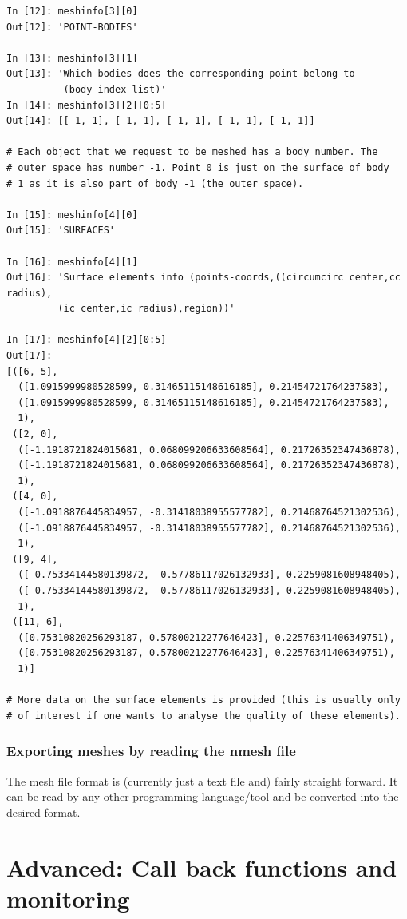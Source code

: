 \documentclass[10pt,a4paper]{book}
\begin{document}
\begin{lstlisting}
In [12]: meshinfo[3][0]
Out[12]: 'POINT-BODIES'

In [13]: meshinfo[3][1]
Out[13]: 'Which bodies does the corresponding point belong to 
          (body index list)'
In [14]: meshinfo[3][2][0:5]
Out[14]: [[-1, 1], [-1, 1], [-1, 1], [-1, 1], [-1, 1]]

# Each object that we request to be meshed has a body number. The 
# outer space has number -1. Point 0 is just on the surface of body 
# 1 as it is also part of body -1 (the outer space).

In [15]: meshinfo[4][0]
Out[15]: 'SURFACES'

In [16]: meshinfo[4][1]
Out[16]: 'Surface elements info (points-coords,((circumcirc center,cc radius),
         (ic center,ic radius),region))'

In [17]: meshinfo[4][2][0:5]
Out[17]: 
[([6, 5],
  ([1.0915999980528599, 0.31465115148616185], 0.21454721764237583),
  ([1.0915999980528599, 0.31465115148616185], 0.21454721764237583),
  1),
 ([2, 0],
  ([-1.1918721824015681, 0.068099206633608564], 0.21726352347436878),
  ([-1.1918721824015681, 0.068099206633608564], 0.21726352347436878),
  1),
 ([4, 0],
  ([-1.0918876445834957, -0.31418038955577782], 0.21468764521302536),
  ([-1.0918876445834957, -0.31418038955577782], 0.21468764521302536),
  1),
 ([9, 4],
  ([-0.75334144580139872, -0.57786117026132933], 0.2259081608948405),
  ([-0.75334144580139872, -0.57786117026132933], 0.2259081608948405),
  1),
 ([11, 6],
  ([0.75310820256293187, 0.57800212277646423], 0.22576341406349751),
  ([0.75310820256293187, 0.57800212277646423], 0.22576341406349751),
  1)]

# More data on the surface elements is provided (this is usually only 
# of interest if one wants to analyse the quality of these elements).

\end{lstlisting}

\subsection{Exporting meshes by reading the nmesh file}\label{sec:exporting-meshes-nmeshfiles}
The mesh file format is (currently just a text file and) fairly
straight forward. It can be read by any other programming
language/tool and be converted into the desired format.




\appendix

\chapter{Advanced: Call back functions and monitoring}
\label{chap:callbackfunctions}
\end{document}

